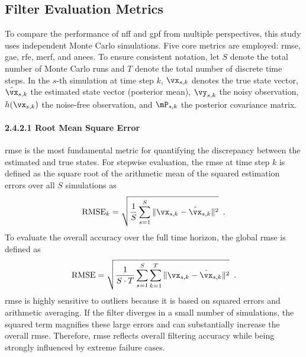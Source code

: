 \subsection{Filter Evaluation Metrics}
\label{subsec:evaluation_metrics}

To compare the performance of \ac{nff} and \ac{gpf} from multiple perspectives, this study uses independent Monte Carlo simulations. Five core metrics are employed: \ac{rmse}, \ac{gae}, \ac{rfe}, \ac{merf}, and \ac{anees}. To ensure consistent notation, let $S$ denote the total number of Monte Carlo runs and $T$ denote the total number of discrete time steps. In the $s$-th simulation at time step $k$, $\vx_{s,k}$ denotes the true state vector, $\hat{\vx}_{s,k}$ the estimated state vector (posterior mean), $\vy_{s,k}$ the noisy observation, $h(\vx_{s,k})$ the noise-free observation, and $\mP_{s,k}$ the posterior covariance matrix.

\paragraph{2.4.2.1 Root Mean Square Error}
\ac{rmse} is the most fundamental metric for quantifying the discrepancy between the estimated and true states. For stepwise evaluation, the \ac{rmse} at time step $k$ is defined as the square root of the arithmetic mean of the squared estimation errors over all $S$ simulations as
\begin{equation}
	\text{RMSE}_k = \sqrt{ \frac{1}{S} \sum_{s=1}^{S} \|\vx_{s,k} - \hat{\vx}_{s,k}\|^2 } \enspace.
\end{equation}
To evaluate the overall accuracy over the full time horizon, the global \ac{rmse} is defined as
\begin{equation}
	\text{RMSE} = \sqrt{ \frac{1}{S \cdot T} \sum_{s=1}^{S} \sum_{k=1}^{T} \|\vx_{s,k} - \hat{\vx}_{s,k}\|^2 } \enspace.
\end{equation}
\ac{rmse} is highly sensitive to outliers because it is based on squared errors and arithmetic averaging. If the filter diverges in a small number of simulations, the squared term magnifies these large errors and can substantially increase the overall \ac{rmse}. Therefore, \ac{rmse} reflects overall filtering accuracy while being strongly influenced by extreme failure cases.

